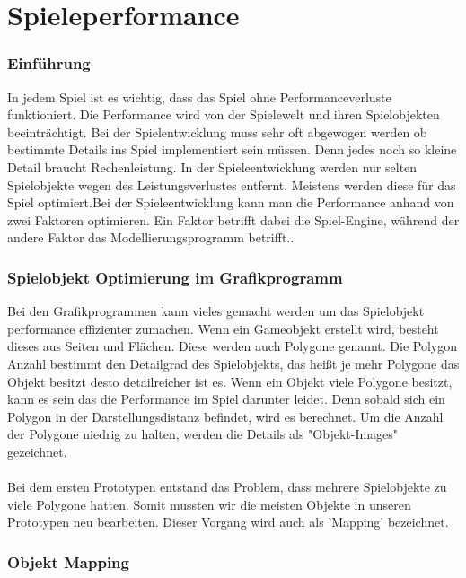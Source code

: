 
\pagebreak
{}
\chapter{Spieleperformance}


\subsection{Einführung}
In jedem Spiel ist es wichtig, dass das Spiel ohne Performanceverluste funktioniert. Die Performance wird von der Spielewelt und ihren Spielobjekten beeinträchtigt. Bei der Spielentwicklung muss sehr oft abgewogen werden ob bestimmte Details ins Spiel implementiert sein müssen. Denn jedes noch so kleine Detail braucht Rechenleistung. In der Spieleentwicklung werden nur selten Spielobjekte wegen des Leistungsverlustes entfernt. Meistens werden diese für das Spiel optimiert.Bei der Spieleentwicklung kann man die Performance anhand von zwei Faktoren optimieren. Ein Faktor betrifft dabei die Spiel-Engine, während der andere Faktor das Modellierungsprogramm betrifft.. %

\subsection{Spielobjekt Optimierung im Grafikprogramm}
Bei den Grafikprogrammen kann vieles gemacht werden um das Spielobjekt performance effizienter zumachen. Wenn ein Gameobjekt erstellt wird, besteht dieses aus Seiten und Flächen. Diese werden auch Polygone genannt. Die Polygon Anzahl bestimmt den Detailgrad des Spielobjekts, das heißt je mehr Polygone das Objekt besitzt desto detailreicher ist es. Wenn ein Objekt viele Polygone besitzt, kann es sein das die Performance im Spiel darunter leidet. Denn sobald sich ein Polygon in der Darstellungsdistanz befindet, wird es berechnet. Um die Anzahl der Polygone niedrig zu halten, werden die Details als "Objekt-Images" gezeichnet. \\\\ %
Bei dem ersten Prototypen entstand das Problem, dass mehrere Spielobjekte zu viele Polygone hatten. Somit mussten wir die meisten Objekte in unseren Prototypen neu bearbeiten. Dieser Vorgang wird auch als 'Mapping' bezeichnet. %
\pagebreak
\subsection{Objekt Mapping}

